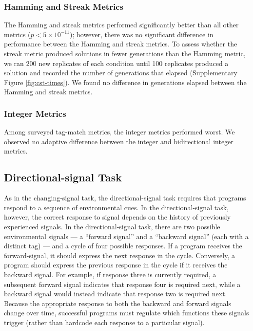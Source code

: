 \subsubsection{Hamming and Streak Metrics}

The Hamming and streak metrics performed significantly better than all other metrics ($p < 5\times10^{-11}$); however, there was no significant difference in performance between the Hamming and streak metrics.
To assess whether the streak metric produced solutions in fewer generations than the Hamming metric, we ran 200 new replicates of each condition until 100 replicates produced a solution and recorded the number of generations that elapsed (Supplementary Figure \ref{fig:cst-times}).
We found no difference in generations elapsed between the Hamming and streak metrics.

\subsubsection{Integer Metrics}

Among surveyed tag-match metrics, the integer metrics performed worst.
We observed no adaptive difference  between the integer and bidirectional integer metrics.

\subsection{Directional-signal Task} \label{sec:directional-signal}



As in the changing-signal task, the directional-signal task requires that programs respond to a sequence of environmental cues.
In the directional-signal task, however, the correct response to signal depends on the history of previously experienced signals.
In the directional-signal task, there are two possible environmental signals --- a ``forward signal'' and a ``backward signal'' (each with a distinct tag) ---  and a cycle of four possible responses.
If a program receives the forward-signal, it should express the next response in the cycle.
Conversely, a program should express the previous response in the cycle if it receives the backward signal.
For example, if response three is currently required, a subsequent forward signal indicates that response four is required next, while a backward signal would instead indicate that response two is required next.
Because the appropriate response to both the backward and forward signals change over time, successful programs must regulate which functions these signals trigger (rather than hardcode each response to a particular signal).

